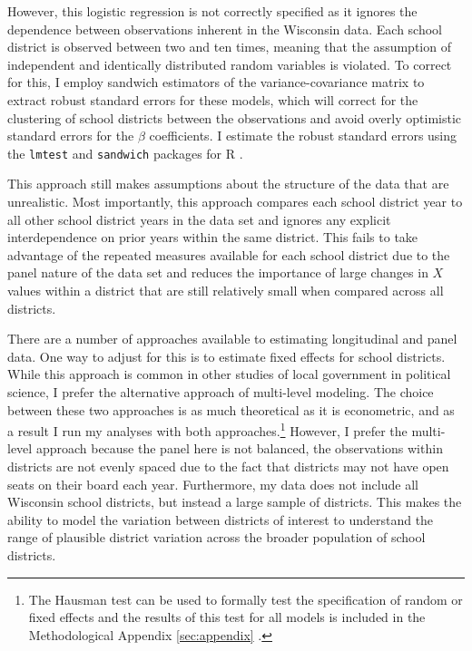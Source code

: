 However, this logistic regression is not correctly specified as it ignores the 
dependence between observations inherent in the Wisconsin data. Each school district 
is observed between two and ten times, meaning that the assumption of independent 
and identically distributed random variables is violated. To correct for this, 
I employ sandwich estimators of the variance-covariance matrix to extract robust 
standard errors for these models, which will correct for the clustering of school districts
between the observations and avoid overly optimistic standard errors for 
the $\beta$ coefficients. I estimate the robust standard errors using 
the \texttt{lmtest} and \texttt{sandwich} packages for R 
\citep{sandwich, sandwich2, lmtest}. 

This approach still makes assumptions about the structure of the data that 
are unrealistic. Most importantly, this approach compares each school district year 
to all other school district years in the data set and ignores any explicit 
interdependence on prior years within the same district. This fails to take advantage 
of the repeated measures available for each school district due to the panel nature 
of the data set and reduces the importance of large changes in $X$ values within a 
district that are still relatively small when compared across all districts. 

There are a number of approaches available to estimating longitudinal and panel 
data. One way to adjust for this is to estimate fixed effects for school districts. 
While this approach is common in other studies of local government in political science, 
I prefer the alternative approach of multi-level modeling. The choice between these two 
approaches is as much theoretical as it is econometric, and as a result I run my analyses 
with both approaches.\footnote{The Hausman test can be used to formally 
test the specification of random or fixed effects and the results of this test for all 
models is included in the Methodological Appendix \ref{sec:appendix} \citep{haustest}.} 
However, I prefer the multi-level approach because the panel here is not balanced, 
the observations within districts are not evenly spaced due to the fact that districts 
may not have open seats on their board each year. Furthermore, my data does not 
include all Wisconsin school districts, but instead a large sample of districts. 
This makes the ability to model the variation between districts of interest to 
understand the range of plausible district variation across the broader population 
of school districts. 

